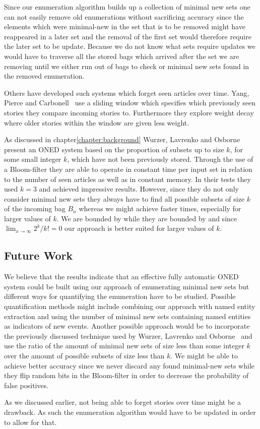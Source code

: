 Since our enumeration algorithm builds up a collection of minimal new sets one can not easily remove old enumerations without sacrificing accuracy since the elements which were minimal-new in the set that is to be removed might have reappeared in a later set and the removal of the first set would therefore require the later set to be update. Because we do not know what sets require updates we would have to traverse all the stored bags which arrived after the set we are removing until we either run out of bags to check or minimal new sets found in the removed enumeration.

Others have developed such systems which forget seen articles over time. Yang, Pierce and Carbonell~\cite{yang1998study} use a sliding window which specifies which previously seen stories they compare incoming stories to. Furthermore they explore weight decay where older stories within the window are given less weight.

As discussed in chapter\ref{chapter:background} Wurzer, Lavrenko and Osborne~\cite{wurzer2015kterm} present an ONED system based on the proportion of subsets up to size $k$, for some small integer $k$, which have not been previously stored. Through the use of a Bloom-filter they are able to operate in constant time per input set in relation to the number of seen articles as well as in constant memory. In their tests they used $k=3$ and achieved impressive results. However, since they do not only consider minimal new sets they always have to find all possible subsets of size $k$ of the incoming bag $B_{n}$ whereas we might achieve faster times, especially for larger values of $k$. We are bounded by  while they are bounded by  and since $\lim_{x \to \infty}2^{k}/k!=0$ our approach is better suited for larger values of $k$. 

\subsection{Future Work}
We believe that the results indicate that an effective fully automatic ONED system could be built using our approach of enumerating minimal new sets but different ways for quantifying the enumeration have to be studied. Possible quantification methods might include combining our approach with named entity extraction and using the number of minimal new sets containing named entities as indicators of new events. Another possible approach would be to incorporate the previously discussed technique used by Wurzer, Lavrenko and Osborne~\cite{wurzer2015kterm} and use the ratio of the amount of minimal new sets of size less than some integer $k$ over the amount of possible subsets of size less than $k$. We might be able to achieve better accuracy since we never discard any found minimal-new sets while they flip random bits in the Bloom-filter in order to decrease the probability of false positives.

As we discussed earlier, not being able to forget stories over time might be a drawback. As such the enumeration algorithm would have to be updated in order to allow for that.

